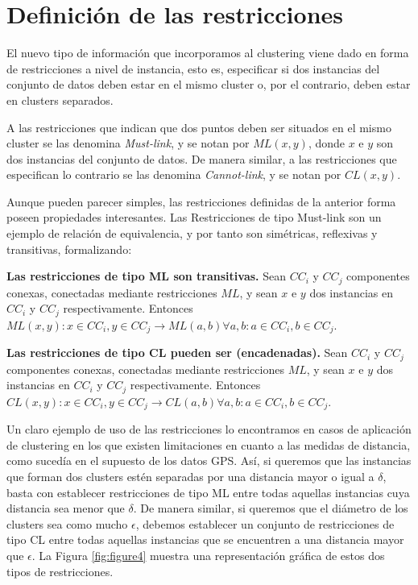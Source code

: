 \section{Definición de las restricciones}

El nuevo tipo de  información que incorporamos al clustering viene dado en forma de restricciones a nivel de instancia, esto es, especificar si dos instancias del conjunto de datos deben estar en el mismo cluster o, por el contrario, deben estar en clusters separados.

A las restricciones que indican que dos puntos deben ser situados en el mismo cluster se las denomina \textit{Must-link}, y se notan por $ML(x,y)$, donde $x$ e $y$ son dos instancias del conjunto de datos. De manera similar, a las restricciones que especifican lo contrario se las denomina \textit{Cannot-link}, y se notan por $CL(x,y)$. \cite{WagstaffCardie:2000}

Aunque pueden parecer simples, las restricciones definidas de la anterior forma poseen propiedades interesantes. Las Restricciones de tipo Must-link son un ejemplo de relación de equivalencia, y por tanto son simétricas, reflexivas y transitivas, formalizando:

\begin{observacion}
	\textbf{Las restricciones de tipo ML son transitivas.} Sean $CC_i$ y $CC_j$ componentes conexas, conectadas mediante restricciones $ML$, y sean $x$ e $y$ dos instancias en $CC_i$ y $CC_j$ respectivamente. Entonces $ML(x,y): x \in CC_i, y \in CC_j \rightarrow ML(a,b) \forall a,b: a\in CC_i, b \in CC_j$. \cite{Survey:2007}
\end{observacion}

\begin{observacion}
	\textbf{Las restricciones de tipo CL pueden ser (encadenadas).} Sean $CC_i$ y $CC_j$ componentes conexas, conectadas mediante restricciones $ML$, y sean $x$ e $y$ dos instancias en $CC_i$ y $CC_j$ respectivamente. Entonces $CL(x,y): x \in CC_i, y \in CC_j \rightarrow CL(a,b) \forall a,b: a\in CC_i, b \in CC_j$. \cite{Survey:2007}
\end{observacion}

Un claro ejemplo de uso de las restricciones lo encontramos en casos de aplicación de clustering en los que existen limitaciones en cuanto a las medidas de distancia, como sucedía en el supuesto de los datos GPS. Así, si queremos que las instancias que forman dos clusters estén separadas por una distancia mayor o igual a $\delta$, basta con establecer restricciones de tipo ML entre todas aquellas instancias cuya distancia sea menor que $\delta$. 
De manera similar, si queremos que el diámetro de los clusters sea como mucho $\epsilon$, debemos establecer un conjunto de restricciones de tipo CL entre todas aquellas instancias que se encuentren a una distancia mayor que $\epsilon$. La Figura \ref{fig:figure4} muestra una representación gráfica de estos dos tipos de restricciones.

